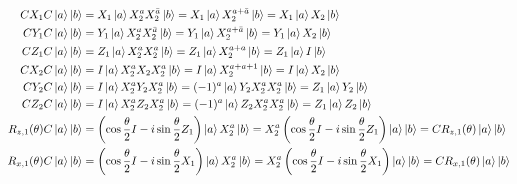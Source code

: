 \begin{ex}
    \label{ex4.31}
    \begin{align*}
        C X_1 C \ket{a} \ket{b}
         & = X_1 \ket{a} X_2^a X_2^{\bar{a}} \ket{b}
        = X_1 \ket{a} X_2^{a + \bar{a}} \ket{b}
        =X_1 \ket{a} X_2 \ket{b}
        \\
        C Y_1 C \ket{a} \ket{b}
         & = Y_1 \ket{a} X_2^a X_2^{\bar{a}} \ket{b}
        = Y_1 \ket{a} X_2^{a + \bar{a}} \ket{b}
        =Y_1 \ket{a} X_2 \ket{b}
        \\
        C Z_1 C \ket{a} \ket{b}
         & = Z_1 \ket{a} X_2^a X_2^{{a}} \ket{b}
        = Z_1 \ket{a} X_2^{a +{a}}\ket{b}
        =Z_1 \ket{a} I \ket{b}
        \\
        C X_2 C \ket{a} \ket{b}
         & = I \ket{a} X_2^a X_2 X_2^a \ket{b}
        = I\ket{a} X_2^{a +{a} + 1}\ket{b}
        = I \ket{a} X_2 \ket{b}
        \\
        C Y_2 C \ket{a} \ket{b}
         & = I \ket{a} X_2^a Y_2 X_2^a \ket{b}
        = (-1)^a \ket{a} Y_2 X_2^a  X_2^a \ket{b}
        = Z_1 \ket{a} Y_2 \ket{b}
        \\
        C Z_2 C \ket{a} \ket{b}
         & = I \ket{a} X_2^a Z_2 X_2^a \ket{b}
        = (-1)^a \ket{a} Z_2 X_2^a  X_2^a \ket{b}
        = Z_1 \ket{a} Z_2 \ket{b}
        \\
        R_{z,1}(\theta) C \ket{a} \ket{b}
         & =
        \left(\cos\frac{\theta}{2} I - i \sin\frac{\theta}{2} Z_1 \right)\ket{a} X_2^a \ket{b}
        =
        X_2^a  \left(\cos\frac{\theta}{2} I - i \sin\frac{\theta}{2} Z_1 \right)\ket{a} \ket{b}
        =
        C R_{z,1}(\theta)\ket{a} \ket{b}
        \\
        R_{x,1}(\theta) C \ket{a} \ket{b}
         & =
        \left(\cos\frac{\theta}{2} I - i \sin\frac{\theta}{2} X_1 \right)\ket{a} X_2^a \ket{b}
        =
        X_2^a  \left(\cos\frac{\theta}{2} I - i \sin\frac{\theta}{2} X_1 \right)\ket{a} \ket{b}
        =
        C R_{x,1}(\theta)\ket{a} \ket{b}
    \end{align*}
\end{ex}


